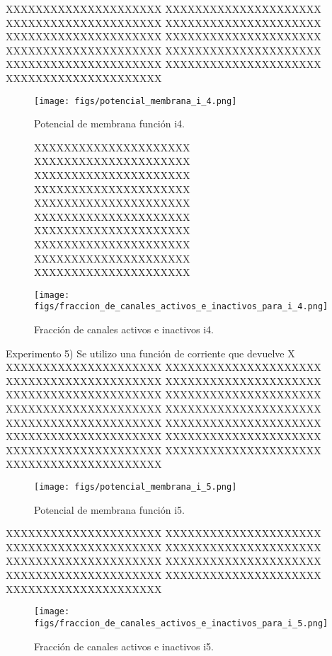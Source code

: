 \documentclass[aps,prl,twocolumn,groupedaddress]{revtex4-2}
\begin{document}
XXXXXXXXXXXXXXXXXXXXX
XXXXXXXXXXXXXXXXXXXXX
XXXXXXXXXXXXXXXXXXXXX
XXXXXXXXXXXXXXXXXXXXX
XXXXXXXXXXXXXXXXXXXXX
XXXXXXXXXXXXXXXXXXXXX
XXXXXXXXXXXXXXXXXXXXX
XXXXXXXXXXXXXXXXXXXXX
XXXXXXXXXXXXXXXXXXXXX
XXXXXXXXXXXXXXXXXXXXX
XXXXXXXXXXXXXXXXXXXXX
\begin{figure}[h!]
\centering
\texttt{[image: figs/potencial\_membrana\_i\_4.png]}
\caption{Potencial de membrana función i4.\label{fig7}}
\end{figure}
\begin{figure}[h!]

XXXXXXXXXXXXXXXXXXXXX
XXXXXXXXXXXXXXXXXXXXX
XXXXXXXXXXXXXXXXXXXXX
XXXXXXXXXXXXXXXXXXXXX
XXXXXXXXXXXXXXXXXXXXX
XXXXXXXXXXXXXXXXXXXXX
XXXXXXXXXXXXXXXXXXXXX
XXXXXXXXXXXXXXXXXXXXX
XXXXXXXXXXXXXXXXXXXXX
XXXXXXXXXXXXXXXXXXXXX


\centering
\texttt{[image: figs/fraccion\_de\_canales\_activos\_e\_inactivos\_para\_i\_4.png]}
\caption{Fracción de canales activos e inactivos i4. \label{fig8}}
\end{figure}

Experimento 5) Se utilizo una función de corriente que devuelve X
XXXXXXXXXXXXXXXXXXXXX
XXXXXXXXXXXXXXXXXXXXX
XXXXXXXXXXXXXXXXXXXXX
XXXXXXXXXXXXXXXXXXXXX
XXXXXXXXXXXXXXXXXXXXX
XXXXXXXXXXXXXXXXXXXXX
XXXXXXXXXXXXXXXXXXXXX
XXXXXXXXXXXXXXXXXXXXX
XXXXXXXXXXXXXXXXXXXXX
XXXXXXXXXXXXXXXXXXXXX
XXXXXXXXXXXXXXXXXXXXX
XXXXXXXXXXXXXXXXXXXXX
XXXXXXXXXXXXXXXXXXXXX
XXXXXXXXXXXXXXXXXXXXX
XXXXXXXXXXXXXXXXXXXXX



\begin{figure}[h!]
\centering
\texttt{[image: figs/potencial\_membrana\_i\_5.png]}
\caption{Potencial de membrana función i5. \label{fig9}}
\end{figure}


XXXXXXXXXXXXXXXXXXXXX
XXXXXXXXXXXXXXXXXXXXX
XXXXXXXXXXXXXXXXXXXXX
XXXXXXXXXXXXXXXXXXXXX
XXXXXXXXXXXXXXXXXXXXX
XXXXXXXXXXXXXXXXXXXXX
XXXXXXXXXXXXXXXXXXXXX
XXXXXXXXXXXXXXXXXXXXX
XXXXXXXXXXXXXXXXXXXXX

\begin{figure}[h!]
\centering
\texttt{[image: figs/fraccion\_de\_canales\_activos\_e\_inactivos\_para\_i\_5.png]}
\caption{Fracción de canales activos e inactivos i5. \label{fig10}}
\end{figure}
\end{document}
